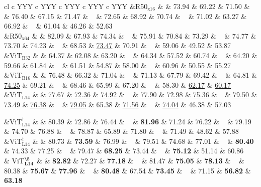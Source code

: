 \begin{table*}[!htbp]
\begin{tabularx}{\textwidth}{cl c YYY c YYY c YYY c YYY c YYY}
&{R50$_{\text{x16}}$} &  & 
73.94 & 69.22 & 71.50  & ~ &
76.40 & 67.15 & 71.47  & ~ &
72.65 & 68.92 & 70.74  & ~ &
71.02 & 63.27 & 66.92  & ~ &
61.04 & 46.26 & 52.63  \\

&{R50$_{\text{x64}}$} &  & 
82.09 & 67.93 & 74.34  & ~ &
75.91 & 70.84 & 73.29  & ~ & 
74.77 & 73.70 & 74.23  & ~ &
68.53 & \underline{73.47} & 70.91  & ~ &
59.06 & 49.52 & 53.87  \\

&{ViT$_{\text{B32}}$} &  & 
64.37 & 62.08 & 63.20  & ~ &
64.34 & 57.52 & 60.74  & ~ &
64.20 & 59.66 & 61.84  & ~ &
61.51 & 54.87 & 58.00  & ~ &
60.96 & 50.55 & 55.27  \\

&{ViT$_{\text{B16}}$} &  & 
76.48 & 66.32 & 71.04  & ~ &
71.13 & 67.79 & 69.42  & ~ &
64.81 & \underline{74.25} & 69.21  & ~ &
68.46 & 65.99 & 67.20  & ~ &
58.30 & \underline{62.17} & \underline{60.17}  \\

&{ViT$_{\text{L14}}$} &  & 
\underline{77.67} & \underline{72.36} & \underline{74.92}  & ~ &
\underline{77.90} & \underline{72.98} & \underline{75.36}  & ~ &
\underline{79.50} & 73.49 & \underline{76.38}  & ~ &
\underline{79.05} & 65.38 & \underline{71.56}  & ~ &
\underline{74.04} & 46.38 & 57.03  \\

{}

&{ViT$_{\text{L14}}^\dag$} &  & 
80.39 & 72.86 & 76.44  & ~ &
\textbf{81.96} & 71.24 & 76.22  & ~ & 
79.19 & 74.70 & 76.88  & ~ &
78.87 & 65.89 & 71.80  & ~ &
71.49 & 48.62 & 57.88  \\

&{ViT$_{\text{L14}}^\ddag$} &  & 
80.73 & \textbf{73.59} & 76.99  & ~ &
79.51 & 74.68 & 77.01  & ~ &
\textbf{80.40} & 74.33 & 77.25  & ~ &
79.47 & \textbf{68.25} & 73.44  & ~ &
\textbf{75.12} & 51.14 & 60.86 \\

& {ViT$_{\text{L14}}^\S$} &   & 
 \textbf{82.82} &  72.27 &  \textbf{77.18}  &  ~ &
 81.47 &  \textbf{75.05} &  \textbf{78.13}  &  ~ &
 80.38 &  \textbf{75.67} &  \textbf{77.96}  &  ~ &
 \textbf{80.48} &  67.54 &  \textbf{73.45}  &  ~ &
 71.15 &  \textbf{56.82} &  \textbf{63.18} \\


\end{tabularx}
\end{table*}
